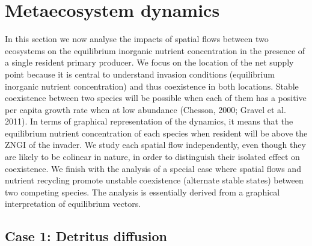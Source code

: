 \documentclass[letterpaper,twocolumn,showkeys]{revtex4-1}
\begin{document}
\section{Metaecosystem dynamics}

In this section we now analyse the impacts of spatial flows between two ecosystems on the equilibrium inorganic nutrient concentration in the presence of a single resident primary producer. We focus on the location of the net supply point because it is central to understand invasion conditions (equilibrium inorganic nutrient concentration) and thus coexistence in both locations. Stable coexistence between two species will be possible when each of them has a positive per capita growth rate when at low abundance (Chesson, 2000; Gravel et al. 2011). In terms of graphical representation of the dynamics, it means that the equilibrium nutrient concentration of each species when resident will be above the ZNGI of the invader. We study each spatial flow independently, even though they are likely to be colinear in nature, in order to distinguish their isolated effect on coexistence. We finish with the analysis of a special case where spatial flows and nutrient recycling promote unstable coexistence (alternate stable states) between two competing species. The analysis is essentially derived from a graphical interpretation of equilibrium vectors.

\subsection{Case 1: Detritus diffusion}
\end{document}
